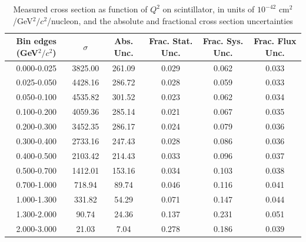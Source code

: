 \documentclass[../main.tex]{subfiles}
\begin{document}
\begin{table}
  \centering
  \renewcommand{\arraystretch}{1.15}
  \caption{Measured cross section as function of $Q^2$ on scintillator, in units of $10^{-42}$ $\text{cm}^2$/GeV${}^2/c{}^2$/nucleon, and the absolute and fractional cross section uncertainties}
    \begin{tabular}{c||c|c||c|c|c}
      Bin edges (GeV${}^2/c{}^2$) &  $\sigma$  &  Abs. Unc.  &  Frac. Stat. Unc.  &  Frac. Sys. Unc.  &  Frac. Flux Unc. \\
      \hline
      \hline
      0.000-0.025 & 3825.00 & 261.09 & 0.029 & 0.062 & 0.033\\
      0.025-0.050 & 4428.16 & 286.72 & 0.028 & 0.059 & 0.033\\
      0.050-0.100 & 4535.82 & 301.52 & 0.023 & 0.062 & 0.034\\
      0.100-0.200 & 4059.36 & 285.14 & 0.021 & 0.067 & 0.035\\
      0.200-0.300 & 3452.35 & 286.17 & 0.024 & 0.079 & 0.036\\
      0.300-0.400 & 2733.16 & 247.43 & 0.028 & 0.086 & 0.036\\
      0.400-0.500 & 2103.42 & 214.43 & 0.033 & 0.096 & 0.037\\
      0.500-0.700 & 1412.01 & 153.16 & 0.034 & 0.103 & 0.038\\
      0.700-1.000 & 718.94 & 89.74 & 0.046 & 0.116 & 0.041\\
      1.000-1.300 & 331.82 & 54.29 & 0.071 & 0.147 & 0.044\\
      1.300-2.000 & 90.74 & 24.36 & 0.137 & 0.231 & 0.051\\
      2.000-3.000 & 21.03 & 7.04 & 0.278 & 0.186 & 0.039
    \end{tabular}
  \label{tbl:datanucleonplasticq2a}
\end{table}
\pagebreak
\end{document}
